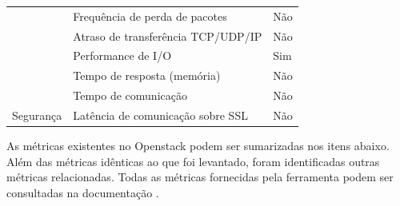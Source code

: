 \documentclass[conference]{IEEEtran}
\begin{document}
\begin{table}[ht]
\begin{tabular}{@{}lll@{}}
                                       & Frequência de perda de pacotes                                                        & Não                                           \\
                                       & Atraso de transferência TCP/UDP/IP                                                    & Não                                           \\
                                       & Performance de I/O                                                                    & Sim                                           \\
                                       & Tempo de resposta (memória)                                                           & Não                                           \\
                                       & Tempo de comunicação                                                                  & Não                                           \\
Segurança                              & Latência de comunicação sobre SSL                                                     & Não                                           \\ \bottomrule
\end{tabular}
\end{table}  

As métricas existentes no Openstack podem ser sumarizadas nos itens abaixo.
Além das métricas idênticas ao que foi levantado, foram identificadas outras
métricas relacionadas. Todas as métricas fornecidas pela ferramenta podem ser consultadas na documentação \cite{openstack}.
\end{document}
